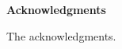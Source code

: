 \documentclass[../hodai_thesis.tex]{subfiles}
\begin{document}
\vspace{0.5cm}
\begin{center}
\LARGE \textbf{Acknowledgments}
\end{center}

The acknowledgments.
\end{document}
